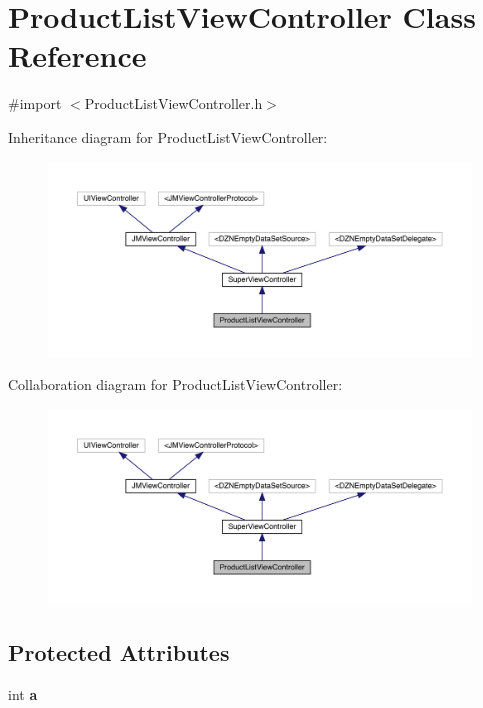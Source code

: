 \hypertarget{interface_product_list_view_controller}{}\section{Product\+List\+View\+Controller Class Reference}
\label{interface_product_list_view_controller}


{\ttfamily \#import $<$Product\+List\+View\+Controller.\+h$>$}



Inheritance diagram for Product\+List\+View\+Controller\+:\nopagebreak
\begin{figure}[H]
\begin{center}
\leavevmode
\includegraphics[width=350pt]{interface_product_list_view_controller__inherit__graph}
\end{center}
\end{figure}


Collaboration diagram for Product\+List\+View\+Controller\+:\nopagebreak
\begin{figure}[H]
\begin{center}
\leavevmode
\includegraphics[width=350pt]{interface_product_list_view_controller__coll__graph}
\end{center}
\end{figure}
\subsection*{Protected Attributes}
\begin{DoxyCompactItemize}
\item 
\mbox{\label{interface_product_list_view_controller_a51ec920dc17423d6a67205c4a1d4611d}} 
int {\bfseries a}
\end{DoxyCompactItemize}

